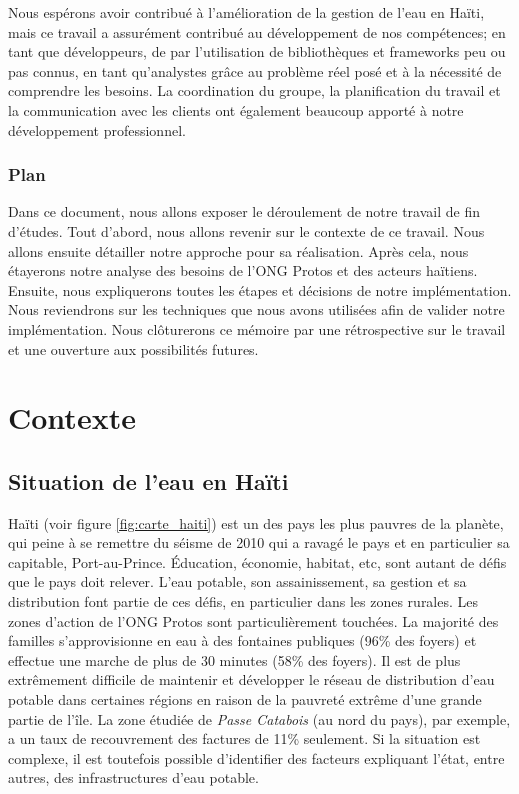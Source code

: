 \documentclass{EPL-master-thesis-covers-FR}
\begin{document}
			Nous espérons avoir contribué à l'amélioration de la gestion de l'eau en Haïti, mais ce travail a assurément contribué au développement de nos compétences; en tant que développeurs, de par l'utilisation de bibliothèques et frameworks peu ou pas connus, en tant qu'analystes grâce au problème réel posé et à la nécessité de comprendre les besoins. La coordination du groupe, la planification du travail et la communication avec les clients ont également beaucoup apporté à notre développement professionnel.

		\subsection*{Plan}

			Dans ce document, nous allons exposer le déroulement de notre travail de fin d'études. Tout d'abord, nous allons revenir sur le contexte de ce travail. Nous allons ensuite détailler notre approche pour sa réalisation. Après cela, nous étayerons notre analyse des besoins de l'ONG Protos et des acteurs haïtiens. Ensuite, nous expliquerons toutes les étapes et décisions de notre implémentation. Nous reviendrons sur les techniques que nous avons utilisées afin de valider notre implémentation. Nous clôturerons ce mémoire par une rétrospective sur le travail et une ouverture aux possibilités futures.

	\chapter{Contexte}


		\section{Situation de l'eau en Haïti}
			\label{sec:situation}


			Haïti (voir figure \ref{fig:carte_haiti}) est un des pays les plus pauvres de la planète, qui peine à se remettre du séisme de 2010 qui a ravagé le pays et en particulier sa capitable, Port-au-Prince. \'Education, économie, habitat, etc, sont autant de défis que le pays doit relever. L'eau potable, son assainissement, sa gestion et sa distribution font partie de ces défis, en particulier dans les zones rurales. Les zones d'action de l'ONG Protos sont particulièrement touchées. La majorité des familles s'approvisionne en eau à des fontaines publiques (96\% des foyers) et effectue une marche de plus de 30 minutes (58\% des foyers). Il est de plus extrêmement difficile de maintenir et développer le réseau de distribution d'eau potable dans certaines régions en raison de la pauvreté extrême d'une grande partie de l'île. La zone étudiée de \emph{Passe Catabois} (au nord du pays), par exemple, a un taux de recouvrement des factures de 11\% seulement. Si la situation est complexe, il est toutefois possible d'identifier des facteurs expliquant l'état, entre autres, des infrastructures d'eau potable.
\end{document}
